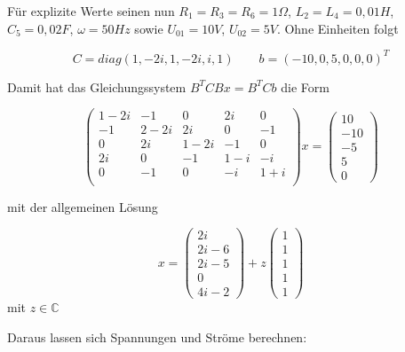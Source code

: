 \documentclass[11pt,titlepage]{article}
\begin{document}
		Für explizite Werte seinen nun $R_1 = R_3 = R_6 = 1 \Omega$, $L_2 = L_4 = 0,01 H$, $C_5 = 0,02 F$, $\omega = 50 Hz$ sowie $U_{01} = 10 V$, $U_{02} = 5 V$.
		Ohne Einheiten folgt
		
		\begin{displaymath}
			C = diag(1, -2i, 1, -2i, i, 1) \qquad b = (-10, 0, 5, 0, 0, 0)^T
		\end{displaymath}
		
		Damit hat das Gleichungssystem $B^T C B x = B^T C b$ die Form
		
		\begin{displaymath}
			\begin{pmatrix}
				1-2i & -1 & 0 & 2i & 0 \\
				-1 & 2-2i & 2i & 0 & -1 \\
				0 & 2i & 1-2i & -1 & 0 \\
				2i & 0 & -1 & 1-i & -i \\
				0 & -1 & 0 & -i & 1+i \\
			\end{pmatrix}
			x=
			\begin{pmatrix}
				10 \\
				-10 \\
				-5\\
				5 \\
				0
			\end{pmatrix}
		\end{displaymath}
		
		mit der allgemeinen Lösung
		
		\begin{displaymath}
			x=
			\begin{pmatrix}
				2i \\
				2i-6 \\
				2i-5 \\
				0 \\
				4i-2
			\end{pmatrix}
			+ z
			\begin{pmatrix}
				1 \\
				1 \\
				1 \\
				1 \\
				1
			\end{pmatrix}
		\end{displaymath}
		mit $z \in \mathbb{C}$
		
		Daraus lassen sich Spannungen und Ströme berechnen:
		
\end{document}
